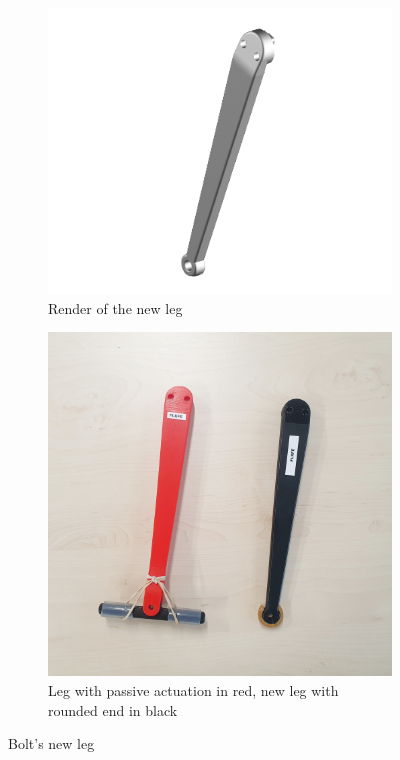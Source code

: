 \documentclass[a4paper,10pt]{article}
\begin{document}
\begin{figure}[H]
\centering

\begin{subfigure}{.5\textwidth}
\centering
  \includegraphics[width=1\linewidth, angle=0, scale=1.2]{./images/render_leg.png}
  \caption{Render of the new leg}
\end{subfigure}%
\begin{subfigure}{.5\textwidth}
\centering
  \includegraphics[width=\linewidth, angle=0, scale=0.9]{./images/Bolt_leg.jpg}
  \caption{Leg with passive actuation in red, new leg with rounded end in black}
\end{subfigure}
\caption{Bolt's new leg}
\label{Bolt new leg}
\end{figure}
\end{document}
